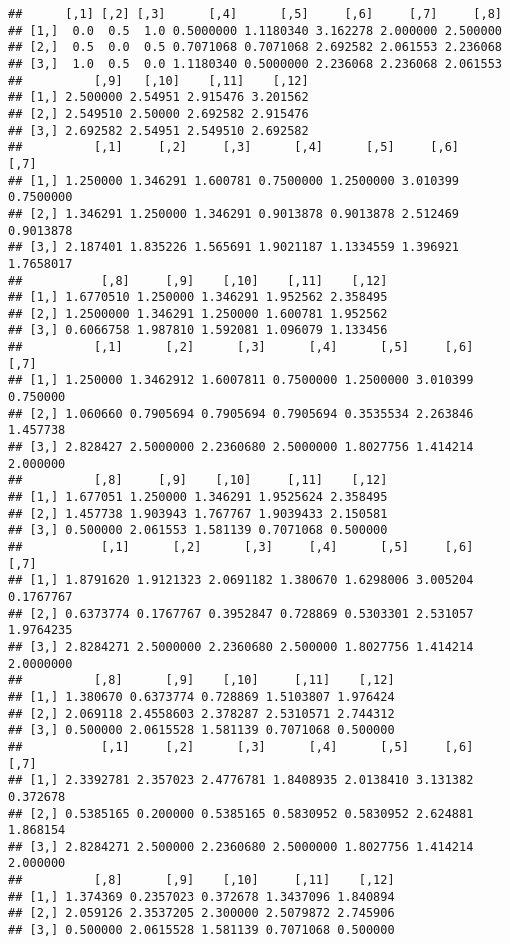 \documentclass[11pt,]{article}
\begin{document}
\begin{verbatim}
##      [,1] [,2] [,3]      [,4]      [,5]     [,6]     [,7]     [,8]
## [1,]  0.0  0.5  1.0 0.5000000 1.1180340 3.162278 2.000000 2.500000
## [2,]  0.5  0.0  0.5 0.7071068 0.7071068 2.692582 2.061553 2.236068
## [3,]  1.0  0.5  0.0 1.1180340 0.5000000 2.236068 2.236068 2.061553
##          [,9]   [,10]    [,11]    [,12]
## [1,] 2.500000 2.54951 2.915476 3.201562
## [2,] 2.549510 2.50000 2.692582 2.915476
## [3,] 2.692582 2.54951 2.549510 2.692582
##          [,1]     [,2]     [,3]      [,4]      [,5]     [,6]      [,7]
## [1,] 1.250000 1.346291 1.600781 0.7500000 1.2500000 3.010399 0.7500000
## [2,] 1.346291 1.250000 1.346291 0.9013878 0.9013878 2.512469 0.9013878
## [3,] 2.187401 1.835226 1.565691 1.9021187 1.1334559 1.396921 1.7658017
##           [,8]     [,9]    [,10]    [,11]    [,12]
## [1,] 1.6770510 1.250000 1.346291 1.952562 2.358495
## [2,] 1.2500000 1.346291 1.250000 1.600781 1.952562
## [3,] 0.6066758 1.987810 1.592081 1.096079 1.133456
##          [,1]      [,2]      [,3]      [,4]      [,5]     [,6]     [,7]
## [1,] 1.250000 1.3462912 1.6007811 0.7500000 1.2500000 3.010399 0.750000
## [2,] 1.060660 0.7905694 0.7905694 0.7905694 0.3535534 2.263846 1.457738
## [3,] 2.828427 2.5000000 2.2360680 2.5000000 1.8027756 1.414214 2.000000
##          [,8]     [,9]    [,10]     [,11]    [,12]
## [1,] 1.677051 1.250000 1.346291 1.9525624 2.358495
## [2,] 1.457738 1.903943 1.767767 1.9039433 2.150581
## [3,] 0.500000 2.061553 1.581139 0.7071068 0.500000
##           [,1]      [,2]      [,3]     [,4]      [,5]     [,6]      [,7]
## [1,] 1.8791620 1.9121323 2.0691182 1.380670 1.6298006 3.005204 0.1767767
## [2,] 0.6373774 0.1767767 0.3952847 0.728869 0.5303301 2.531057 1.9764235
## [3,] 2.8284271 2.5000000 2.2360680 2.500000 1.8027756 1.414214 2.0000000
##          [,8]      [,9]    [,10]     [,11]    [,12]
## [1,] 1.380670 0.6373774 0.728869 1.5103807 1.976424
## [2,] 2.069118 2.4558603 2.378287 2.5310571 2.744312
## [3,] 0.500000 2.0615528 1.581139 0.7071068 0.500000
##           [,1]     [,2]      [,3]      [,4]      [,5]     [,6]     [,7]
## [1,] 2.3392781 2.357023 2.4776781 1.8408935 2.0138410 3.131382 0.372678
## [2,] 0.5385165 0.200000 0.5385165 0.5830952 0.5830952 2.624881 1.868154
## [3,] 2.8284271 2.500000 2.2360680 2.5000000 1.8027756 1.414214 2.000000
##          [,8]      [,9]    [,10]     [,11]    [,12]
## [1,] 1.374369 0.2357023 0.372678 1.3437096 1.840894
## [2,] 2.059126 2.3537205 2.300000 2.5079872 2.745906
## [3,] 0.500000 2.0615528 1.581139 0.7071068 0.500000
\end{verbatim}
\end{document}
